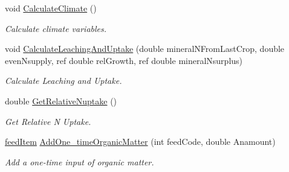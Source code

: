 \begin{DoxyCompactItemize}
void \mbox{\hyperlink{class_crop_class_add2e8db24ef3c2fa6d1fdbe5ba617097}{Calculate\+Climate}} ()
\begin{DoxyCompactList}\small\item\em Calculate climate variables. \end{DoxyCompactList}\item 
void \mbox{\hyperlink{class_crop_class_ae0e4325ab32156542dbdc53a9ccb427b}{Calculate\+Leaching\+And\+Uptake}} (double mineral\+N\+From\+Last\+Crop, double even\+Nsupply, ref double rel\+Growth, ref double mineral\+Nsurplus)
\begin{DoxyCompactList}\small\item\em Calculate Leaching and Uptake. \end{DoxyCompactList}\item 
double \mbox{\hyperlink{class_crop_class_ad636f411f04fe154b85e96d254a60bf7}{Get\+Relative\+Nuptake}} ()
\begin{DoxyCompactList}\small\item\em Get Relative N Uptake. \end{DoxyCompactList}\item 
\mbox{\hyperlink{classfeed_item}{feed\+Item}} \mbox{\hyperlink{class_crop_class_aa0f85f842c98fcdebc9c914fde896246}{Add\+One\+\_\+time\+Organic\+Matter}} (int feed\+Code, double Anamount)
\begin{DoxyCompactList}\small\item\em Add a one-\/time input of organic matter. \end{DoxyCompactList}\end{DoxyCompactItemize}
